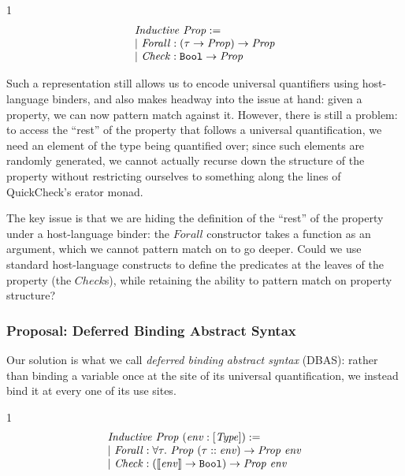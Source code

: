 \providecommand*{\Ind}{\ensuremath{\mathit{Inductive}}}
\providecommand*{\mforall}{\ensuremath{\mathit{Forall}}}
\providecommand*{\mcheck}{\ensuremath{\mathit{Check}}}
\providecommand*{\mprop}{\ensuremath{\mathit{Prop}}}
\begin{spacing}{1}
  \[
    \begin{array}{l}
      \Ind ~ \mprop :=                                            \\
      |~ \mforall : (\tau \rightarrow  \mprop) \rightarrow \mprop \\
      |~ \mcheck  : \tbool \rightarrow \mprop                     \\
    \end{array}
  \]
\end{spacing}
\vspace{0.5\baselineskip}

Such a representation still allows us to encode universal quantifiers using
host-language binders, and also makes headway into the issue at hand: given a property,
we can now pattern match against it. However, there is still a problem: to access the
``rest'' of the property that follows a universal quantification, we need an element of
the type being quantified over; since such elements are randomly generated, we cannot
actually recurse down the structure of the property without restricting ourselves to
something along the lines of QuickCheck's erator monad.

The key issue is that we are hiding the definition of the ``rest'' of the property
under a host-language binder: the $\mforall$ constructor takes a function as an
argument, which we cannot pattern match on to go deeper. Could we use standard
host-language constructs to define the predicates at the leaves of the property (the
$\mcheck$s), while retaining the ability to pattern match on property structure?

\subsubsection{Proposal: Deferred Binding Abstract Syntax}

Our solution is what we call \emph{deferred binding abstract syntax} (DBAS): rather
than binding a variable once at the site of its universal quantification, we instead
bind it at every one of its use sites.

\providecommand*{\menv}{\ensuremath{\mathit{env}}}
\providecommand*{\mType}{\ensuremath{\mathit{Type}}}
\begin{spacing}{1}
  \[
    \begin{array}{l}
      \Ind ~ \mprop ~ (\menv : [\mType]) :=                                              \\
      | ~ \mforall : \forall \tau. ~ \mprop ~ (\tau :: \menv) \rightarrow \mprop ~ \menv \\
      | ~ \mcheck  : (\denv{\menv} \rightarrow \tbool) \rightarrow \mprop ~ \menv        \\
    \end{array}
  \]
\end{spacing}
\vspace{0.5\baselineskip}

